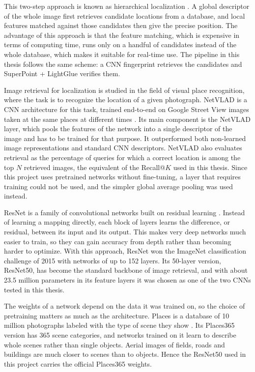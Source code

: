 \documentclass[english, Lau, oneside]{sapthesis}%
\begin{document}
This two-step approach is known as hierarchical localization \citep{sarlin2019hloc}. A global descriptor of the whole image first retrieves candidate locations from a database, and local features matched against those candidates then give the precise position. The advantage of this approach is that the feature matching, which is expensive in terms of computing time, runs only on a handful of candidates instead of the whole database, which makes it suitable for real-time use. The pipeline in this thesis follows the same scheme: a CNN fingerprint retrieves the candidates and SuperPoint + LightGlue verifies them.

Image retrieval for localization is studied in the field of visual place recognition, where the task is to recognize the location of a given photograph. NetVLAD is a CNN architecture for this task, trained end-to-end on Google Street View images taken at the same places at different times \citep{arandjelovic2016netvlad}. Its main component is the NetVLAD layer, which pools the features of the network into a single descriptor of the image and has to be trained for that purpose. It outperformed both non-learned image representations and standard CNN descriptors. NetVLAD also evaluates retrieval as the percentage of queries for which a correct location is among the top $N$ retrieved images, the equivalent of the Recall@$K$ used in this thesis. Since this project uses pretrained networks without fine-tuning, a layer that requires training could not be used, and the simpler global average pooling was used instead.

ResNet is a family of convolutional networks built on residual learning \citep{he2016resnet}. Instead of learning a mapping directly, each block of layers learns the difference, or residual, between its input and its output. This makes very deep networks much easier to train, so they can gain accuracy from depth rather than becoming harder to optimize. With this approach, ResNet won the ImageNet classification challenge of 2015 with networks of up to 152 layers. Its 50-layer version, ResNet50, has become the standard backbone of image retrieval, and with about 23.5 million parameters in its feature layers it was chosen as one of the two CNNs tested in this thesis.

The weights of a network depend on the data it was trained on, so the choice of pretraining matters as much as the architecture. Places is a database of 10 million photographs labeled with the type of scene they show \citep{zhou2018places}. Its Places365 version has 365 scene categories, and networks trained on it learn to describe whole scenes rather than single objects. Aerial images of fields, roads and buildings are much closer to scenes than to objects. Hence the ResNet50 used in this project carries the official Places365 weights.
\end{document}
